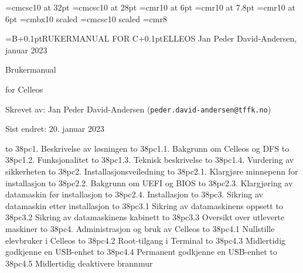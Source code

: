 



\font\ftitteltop=cmcsc10 at 32pt
\font\ftittelbottom=cmcsc10 at 28pt
\font\ftopptekst=cmr10 at 6pt
\font\ftopptekststor=cmr10 at 7.8pt
\font\fforfatter=cmr10 at 6pt
\font\fs=cmbx10 scaled
\font\fss=cmcsc10 scaled
\font\fc=cmr8

\def\imagewithcaption#1#2#3{
\centerline{
\vbox{\hbox{\epsfxsize #1 \epsffile{#2}}
\vskip 2pt
\hbox{\raise 4pt \vbox{\hsize=#1 \noindent \fc \baselineskip=9pt #3}}}}}

\headline={\ftopptekststor B\kern+0.1pt{\ftopptekst RUKERMANUAL FOR } C\kern+0.1pt{\ftopptekst ELLEOS \hfill Jan Peder David-Andersen, januar 2023}}

\topglue 6pc
\centerline{\ftitteltop Brukermanual}
\vskip 10pt
\centerline{\ftittelbottom for Celleos}
\vskip 8pc

\noindent Skrevet av: Jan Peder David-Andersen ({\tt peder.david-andersen@tffk.no})

\noindent Sist endret: 20. januar 2023

\vskip 3pc
\def\tocwidth{38pc}


\hbox to \tocwidth{1. Beskrivelse av l\o sningen }
\smallskip
\hbox to \tocwidth{1.1. Bakgrunn om Celleos og DFS }
\hbox to \tocwidth{1.2. Funksjonalitet }
\hbox to \tocwidth{1.3. Teknisk beskrivelse }
\hbox to \tocwidth{1.4. Vurdering av sikkerheten }
\medskip
\hbox to \tocwidth{2. Installasjonsveiledning }
\smallskip
\hbox to \tocwidth{2.1. Klargj\o re minnepenn for installasjon }
\hbox to \tocwidth{2.2. Bakgrunn om UEFI og BIOS }
\hbox to \tocwidth{2.3. Klargj\o ring av datamaskin f\o r installasjon }
\hbox to \tocwidth{2.4. Installasjon }
\medskip
\hbox to \tocwidth{3. Sikring av datamaskin etter installasjon }
\smallskip
\hbox to \tocwidth{3.1 Sikring av datamaskinens oppsett }
\hbox to \tocwidth{3.2 Sikring av datamaskinens kabinett }
\hbox to \tocwidth{3.3 Oversikt over utleverte maskiner }
\medskip
\hbox to \tocwidth{4. Administrasjon og bruk av Celleos }
\smallskip
\hbox to \tocwidth{4.1 Nullstille elevbruker i Celleos }
\hbox to \tocwidth{4.2 Root-tilgang i Terminal }
\hbox to \tocwidth{4.3 Midlertidig godkjenne en USB-enhet }
\hbox to \tocwidth{4.4 Permanent godkjenne en USB-enhet }
\hbox to \tocwidth{4.5 Midlertidig deaktivere brannmur }



